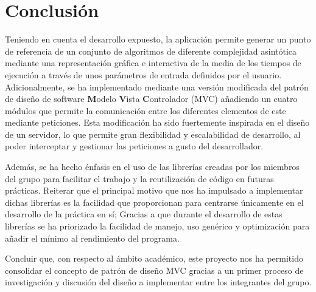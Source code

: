 \section{Conclusión}

Teniendo en cuenta el desarrollo expuesto, la aplicación permite generar un punto de referencia de un conjunto de algoritmos de diferente complejidad asintótica mediante una representación gráfica e interactiva de la media de los tiempos de ejecución a través de unos parámetros de entrada definidos por el usuario. Adicionalmente, se ha implementado mediante una versión modificada del patrón de diseño de software \textbf{M}odelo \textbf{V}ista \textbf{C}ontrolador (MVC) añadiendo un cuatro módulos que permite la comunicación entre los diferentes elementos de este mediante peticiones. Esta modificación ha sido fuertemente inspirada en el diseño de un servidor, lo que permite gran flexibilidad y escalabilidad de desarrollo, al poder interceptar y gestionar las peticiones a gusto del desarrollador.\bigskip

Además, se ha hecho énfasis en el uso de las librerías creadas por los miembros del grupo para facilitar el trabajo y la reutilización de código en futuras prácticas. Reiterar que el principal motivo que nos ha impulsado a implementar dichas librerías es la facilidad que proporcionan para centrarse únicamente en el desarrollo de la práctica en sí; Gracias a que durante el desarrollo de estas librerías se ha priorizado la facilidad de manejo, uso genérico y optimización para añadir el mínimo  al rendimiento del programa.\bigskip

Concluir que, con respecto al ámbito académico, este proyecto nos ha permitido consolidar el concepto de patrón de diseño MVC gracias a un primer proceso de investigación y discusión del diseño a implementar entre los integrantes del grupo.